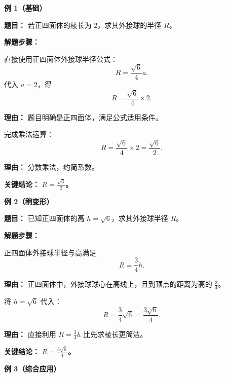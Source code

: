 \begin{examplebox}
	\textbf{\textcolor{CExample}{例 1（基础）}}

	\textbf{\textcolor{CExample}{题目：}} 若正四面体的棱长为 $2$，求其外接球的半径 $R$。

	\textbf{\textcolor{CExample}{解题步骤：}}
	\begin{description}[style=nextline, leftmargin=2.8em, labelsep=0.5em, itemsep=0.45em]
		\item[\textbf{第一步（代入公式）：}] 直接使用正四面体外接球半径公式：
		      \[
			      R = \frac{\sqrt{6}}{4}a.
		      \]
		      代入 $a=2$，得
		      \[
			      R = \frac{\sqrt{6}}{4}\times 2.
		      \]
		      \par\textbf{理由：} 题目明确是正四面体，满足公式适用条件。

		\item[\textbf{第二步（计算数值）：}] 完成乘法运算：
		      \[
			      R = \frac{\sqrt{6}}{4}\times 2 = \frac{\sqrt{6}}{2}.
		      \]
		      \par\textbf{理由：} 分数乘法，约简系数。
	\end{description}

	\textbf{\textcolor{CExample}{关键结论：}} \textbf{$R = \frac{\sqrt{6}}{2}$。}

	\medskip
	\textbf{\textcolor{CExample}{例 2（稍变形）}}

	\textbf{\textcolor{CExample}{题目：}} 已知正四面体的高 $h = \sqrt{6}$，求其外接球半径 $R$。

	\textbf{\textcolor{CExample}{解题步骤：}}
	\begin{description}[style=nextline, leftmargin=2.8em, labelsep=0.5em, itemsep=0.45em]
		\item[\textbf{第一步（使用棱高关系）：}] 正四面体外接球半径与高满足
		      \[
			      R=\frac{3}{4}h.
		      \]
		      \par\textbf{理由：} 正四面体中，外接球球心在高线上，且到顶点的距离为高的 $\frac{3}{4}$。

		\item[\textbf{第二步（代入计算）：}] 将 $h=\sqrt{6}$ 代入：
		      \[
			      R=\frac{3}{4}\sqrt{6}=\frac{3\sqrt{6}}{4}.
		      \]
		      \par\textbf{理由：} 直接利用 $R=\frac{3}{4}h$ 比先求棱长更简洁。
	\end{description}

	\textbf{\textcolor{CExample}{关键结论：}} \textbf{$R = \frac{3\sqrt{6}}{4}$。}

	\medskip
	\textbf{\textcolor{CExample}{例 3（综合应用）}}


\end{examplebox}
